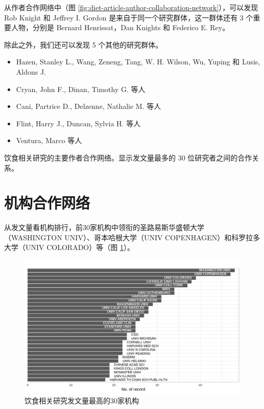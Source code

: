 \documentclass[]{ctexbook}
\begin{document}
从作者合作网络中（图 \ref{fig:diet-article-author-collaboration-network}），可以发现 Rob Knight 和 Jeffrey I. Gordon 是来自于同一个研究群体，这一群体还有 3 个重要人物，分别是 Bernard Henrissat，Dan Knights 和 Federico E. Rey。

除此之外，我们还可以发现 5 个其他的研究群体。

\begin{itemize}
\item
  Hazen, Stanley L., Wang, Zeneng, Tang, W. H. Wilson, Wu, Yuping 和 Lusis, Aldons J.
\item
  Cryan, John F., Dinan, Timothy G. 等人
\item
  Cani, Partrice D., Delzenne, Nathalie M. 等人
\item
  Flint, Harry J., Duncan, Sylvia H. 等人
\item
  Ventura, Marco 等人
\end{itemize}

\hypertarget{htmlwidget-8d05998c4e2890c11196}{}

\label{fig:diet-article-author-collaboration-network}饮食相关研究的主要作者合作网络。显示发文量最多的 30 位研究者之间的合作关系。

\hypertarget{ux673aux6784ux5408ux4f5cux7f51ux7edc}{%
\section{机构合作网络}\label{ux673aux6784ux5408ux4f5cux7f51ux7edc}}

从发文量看机构排行，前30家机构中领衔的圣路易斯华盛顿大学（WASHINGTON UNIV）、哥本哈根大学（UNIV COPENHAGEN）和科罗拉多大学（UNIV COLORADO）等（图 \ref{fig:diet-univeristy-top30}）。

\begin{figure}
\includegraphics[width=1\linewidth]{plots/diet-univeristy-top30-1} \caption{饮食相关研究发文量最高的30家机构}\label{fig:diet-univeristy-top30}
\end{figure}
\end{document}
